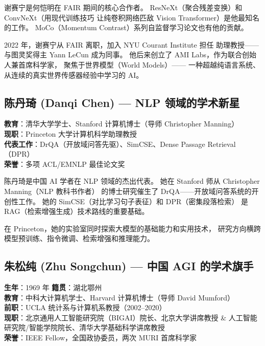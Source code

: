 谢赛宁是何恺明在 FAIR 期间的核心合作者。
ResNeXt（聚合残差变换）和 ConvNeXt（用现代训练技巧
让纯卷积网络匹敌 Vision Transformer）是他最知名的工作。
MoCo（Momentum Contrast）系列自监督学习论文也有他的贡献。

2022 年，谢赛宁从 FAIR 离职，加入 NYU Courant Institute 担任
助理教授——与图灵奖得主 Yann LeCun 成为同事。
他后来创立了 AMI Labs，作为联合创始人兼首席科学家，
聚焦于世界模型（World Models）——
一种超越纯语言系统、从连续的真实世界传感器经验中学习的 AI。


\subsection{陈丹琦 (Danqi Chen) — NLP 领域的学术新星}

\begin{keybox}
\textbf{教育}：清华大学学士、Stanford 计算机博士（导师 Christopher Manning） \\
\textbf{现职}：Princeton 大学计算机科学助理教授 \\
\textbf{代表工作}：DrQA（开放域问答先驱）、SimCSE、Dense Passage Retrieval（DPR）\\
\textbf{荣誉}：多项 ACL/EMNLP 最佳论文奖
\end{keybox}

陈丹琦是中国 AI 学者在 NLP 领域的杰出代表。
她在 Stanford 师从 Christopher Manning（NLP 教科书作者）
的博士研究催生了 DrQA——开放域问答系统的开创性工作。
她的 SimCSE（对比学习句子表征）和 DPR（密集段落检索）
是 RAG（检索增强生成）技术路线的重要基础。

在 Princeton，她的实验室同时探索大模型的基础能力和实用技术，
研究方向横跨模型预训练、指令微调、检索增强和推理能力。


\subsection{朱松纯 (Zhu Songchun) — 中国 AGI 的学术旗手}

\begin{keybox}
\textbf{生年}：1969 年 \quad \textbf{籍贯}：湖北鄂州 \\
\textbf{教育}：中科大计算机学士、Harvard 计算机博士（导师 David Mumford） \\
\textbf{前职}：UCLA 统计系与计算机系教授（2002--2020）\\
\textbf{现职}：北京通用人工智能研究院（BIGAI）院长、北京大学讲席教授 \& 人工智能研究院/智能学院院长、清华大学基础科学讲席教授 \\
\textbf{荣誉}：IEEE Fellow，全国政协委员，两次 MURI 首席科学家
\end{keybox}


